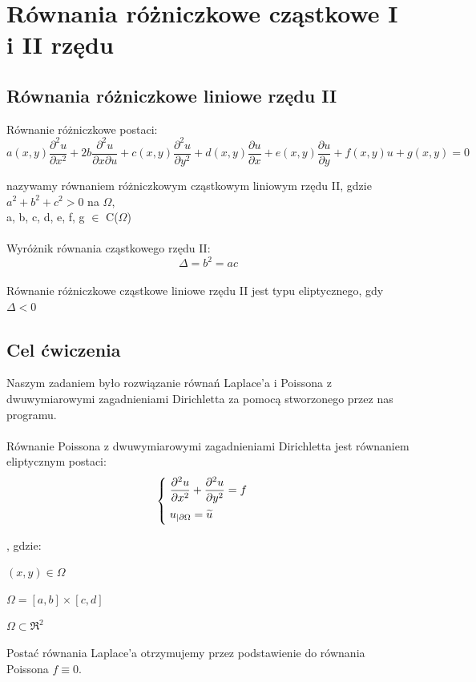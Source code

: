 \section{Równania różniczkowe cząstkowe I i II rzędu}
\subsection{Równania różniczkowe liniowe rzędu II}
Równanie różniczkowe postaci:
$$ a(x,y) \dfrac{\partial^2u}{\partial x^2} + 2b \dfrac{\partial ^2u}{\partial x \partial u} + c(x,y)\dfrac{\partial^2u}{\partial y^2} + d(x,y) \dfrac{\partial u}{\partial x} + e(x,y) \dfrac{\partial u}{\partial y} + f(x,y) u + g(x,y) = 0$$

nazywamy równaniem różniczkowym cząstkowym liniowym rzędu II, gdzie $a^2 + b^2 + c^2>0$ na $\Omega$,\\ a, b, c, d, e, f, g $\in$ C($\Omega$)
\\
\\
Wyróżnik równania cząstkowego rzędu II:
$$\Delta = b^2 = ac$$\\
Równanie różniczkowe cząstkowe liniowe rzędu II jest typu eliptycznego, gdy $\Delta < 0$

\subsection{Cel ćwiczenia}
Naszym zadaniem było rozwiązanie równań Laplace'a i Poissona z dwuwymiarowymi zagadnieniami Dirichletta za pomocą stworzonego przez nas programu.
\\
\\
Równanie Poissona z dwuwymiarowymi zagadnieniami Dirichletta jest równaniem eliptycznym postaci:
\[
\begin{cases}
\vspace{0.1cm} 
\hspace{0,1cm}\dfrac{\partial^2 u}{\partial x^2} + \dfrac{\partial^2 u}{\partial y^2} = f\\
\vspace{0.1cm}
\hspace{0,1cm}u_{|\partial \Omega} = \widetilde{u} \\
\end{cases}
\]

, gdzie:

$(x,y) \in \Omega$

$\Omega = [a,b] \times [c,d]$

$\Omega \subset \Re^2$

Postać równania Laplace'a otrzymujemy przez podstawienie do równania Poissona $f \equiv 0$. \\

